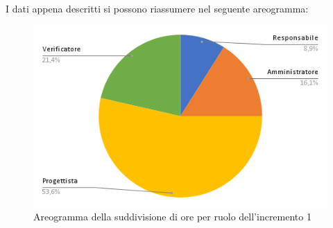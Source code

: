 \pagebreak
I dati appena descritti si possono riassumere nel seguente areogramma:
\begin{figure}[!h]
    \vspace{5px}
    \includegraphics[scale=0.5]{../../../Images/Diagrammi/Diagramma a torta/areogrammaIncremento6.png}
    \centering
    \caption{Areogramma della suddivisione di ore per ruolo dell'incremento 1}
\end{figure}

